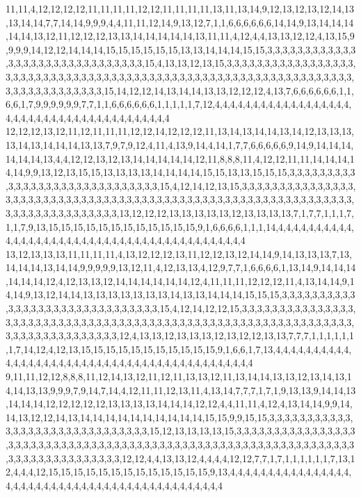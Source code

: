 11,11,4,12,12,12,12,11,11,11,11,12,12,11,11,11,11,13,11,13,14,9,12,13,12,13,12,14,13,13,14,14,7,7,14,14,9,9,9,4,4,11,11,12,14,9,13,12,7,1,1,6,6,6,6,6,6,14,14,9,13,14,14,14,14,14,13,12,11,12,12,12,13,13,14,14,14,14,14,13,11,11,4,12,4,4,13,13,12,12,4,13,15,9,9,9,9,14,12,12,14,14,14,15,15,15,15,15,15,13,13,14,14,14,15,15,3,3,3,3,3,3,3,3,3,3,3,3,3,3,3,3,3,3,3,3,3,3,3,3,3,3,3,3,3,3,15,4,13,13,12,13,15,3,3,3,3,3,3,3,3,3,3,3,3,3,3,3,3,3,3,3,3,3,3,3,3,3,3,3,3,3,3,3,3,3,3,3,3,3,3,3,3,3,3,3,3,3,3,3,3,3,3,3,3,3,3,3,3,3,3,3,3,3,3,3,3,3,3,3,3,3,3,3,3,3,3,3,3,15,14,12,12,14,13,14,14,13,13,12,12,12,4,13,7,6,6,6,6,6,6,1,1,6,6,1,7,9,9,9,9,9,9,7,7,1,1,6,6,6,6,6,6,1,1,1,1,1,7,12,4,4,4,4,4,4,4,4,4,4,4,4,4,4,4,4,4,4,4,4,4,4,4,4,4,4,4,4,4,4,4,4,4,4,4,4,4,4,4,4
12,12,12,13,12,11,12,11,11,11,12,12,14,12,12,12,11,13,14,13,14,14,13,14,12,13,13,13,13,14,13,14,14,14,13,13,7,9,7,9,12,4,11,4,13,9,14,4,14,1,7,7,6,6,6,6,6,9,14,9,14,14,14,14,14,14,13,4,4,12,12,13,12,13,14,14,14,14,14,12,11,8,8,8,11,4,12,12,11,11,14,14,14,14,14,9,9,13,12,13,15,15,13,13,13,13,14,14,14,14,15,15,13,13,15,15,15,3,3,3,3,3,3,3,3,3,3,3,3,3,3,3,3,3,3,3,3,3,3,3,3,3,3,3,3,3,15,4,12,14,12,13,15,3,3,3,3,3,3,3,3,3,3,3,3,3,3,3,3,3,3,3,3,3,3,3,3,3,3,3,3,3,3,3,3,3,3,3,3,3,3,3,3,3,3,3,3,3,3,3,3,3,3,3,3,3,3,3,3,3,3,3,3,3,3,3,3,3,3,3,3,3,3,3,3,3,3,3,3,13,12,12,12,13,13,13,13,13,12,13,13,13,13,7,1,7,7,1,1,1,7,1,1,7,9,13,15,15,15,15,15,15,15,15,15,15,15,15,9,1,6,6,6,6,1,1,1,14,4,4,4,4,4,4,4,4,4,4,4,4,4,4,4,4,4,4,4,4,4,4,4,4,4,4,4,4,4,4,4,4,4,4,4,4,4,4,4,4,4,4
13,12,13,13,13,11,11,11,11,4,13,12,12,12,13,11,12,12,13,12,14,14,9,14,13,13,13,7,13,14,14,14,13,14,14,9,9,9,9,9,13,12,11,4,12,13,13,4,12,9,7,7,1,6,6,6,6,1,13,14,9,14,14,14,14,14,14,12,4,12,13,13,12,14,14,14,14,14,14,12,4,11,11,11,12,12,12,11,4,13,14,14,9,14,14,9,13,12,14,14,13,13,13,13,13,13,13,14,13,13,14,14,14,15,15,15,3,3,3,3,3,3,3,3,3,3,3,3,3,3,3,3,3,3,3,3,3,3,3,3,3,3,3,3,3,3,15,4,12,14,12,12,15,3,3,3,3,3,3,3,3,3,3,3,3,3,3,3,3,3,3,3,3,3,3,3,3,3,3,3,3,3,3,3,3,3,3,3,3,3,3,3,3,3,3,3,3,3,3,3,3,3,3,3,3,3,3,3,3,3,3,3,3,3,3,3,3,3,3,3,3,3,3,3,3,3,3,3,3,12,4,13,13,12,13,13,13,12,13,12,12,13,13,7,7,7,1,1,1,1,1,1,1,7,14,12,4,12,13,15,15,15,15,15,15,15,15,15,15,15,9,1,6,6,1,7,13,4,4,4,4,4,4,4,4,4,4,4,4,4,4,4,4,4,4,4,4,4,4,4,4,4,4,4,4,4,4,4,4,4,4,4,4,4,4,4,4,4,4,4
9,11,11,12,12,8,8,8,11,12,14,13,12,11,12,11,13,13,12,11,13,14,14,13,13,12,13,14,13,14,14,13,13,9,9,9,7,9,14,7,14,4,12,11,11,12,13,11,4,13,14,7,7,7,1,7,1,9,13,13,9,14,14,13,14,14,14,12,12,12,12,12,13,13,13,13,14,14,14,12,12,4,4,11,11,4,12,4,13,14,14,9,9,14,14,13,12,12,14,13,14,14,14,14,14,14,14,14,14,14,15,15,9,9,15,15,3,3,3,3,3,3,3,3,3,3,3,3,3,3,3,3,3,3,3,3,3,3,3,3,3,3,3,3,3,3,15,12,13,13,13,13,15,3,3,3,3,3,3,3,3,3,3,3,3,3,3,3,3,3,3,3,3,3,3,3,3,3,3,3,3,3,3,3,3,3,3,3,3,3,3,3,3,3,3,3,3,3,3,3,3,3,3,3,3,3,3,3,3,3,3,3,3,3,3,3,3,3,3,3,3,3,3,3,3,3,3,3,3,3,12,12,4,4,13,13,12,4,4,4,4,12,12,7,7,1,7,1,1,1,1,1,1,7,13,12,4,4,4,12,15,15,15,15,15,15,15,15,15,15,15,15,15,9,13,4,4,4,4,4,4,4,4,4,4,4,4,4,4,4,4,4,4,4,4,4,4,4,4,4,4,4,4,4,4,4,4,4,4,4,4,4,4,4,4,4,4,4,4,4
